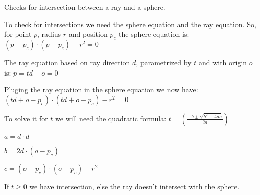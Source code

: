 Checks for intersection between a ray and a sphere. 

To check for intersections we need the sphere equation and the ray equation. So, for point $p$, radius $r$ and position $p_c$ the sphere equation is\-: $(p - p_c) \cdot (p - p_c) - r^2 = 0$

The ray equation based on ray direction $d$, parametrized by $t$ and with origin $o$ is\-: $p = t d + o = 0$

Pluging the ray equation in the sphere equation we now have\-: $(t d + o - p_c) \cdot (t d + o - p_c) - r^2 = 0$

To solve it for $t$ we will need the quadratic formula\-: $t = \left(\frac{-b \pm \sqrt{b^2 - 4ac}}{2a}\right)$
\begin{DoxyItemize}
\item $a = d \cdot d$
\item $b = 2 d \cdot (o - p_c)$
\item $c = (o - p_c) \cdot (o - p_c) - r^2$
\end{DoxyItemize}

If $t \ge 0$ we have intersection, else the ray doesn't intersect with the sphere. 